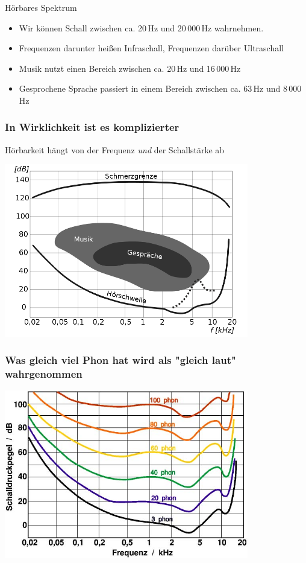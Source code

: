 \documentclass{beamer}
\begin{document}
\begin{frame}{Hörbares Spektrum}

\begin{itemize}
    \item 
    Wir können Schall zwischen ca. 20\,Hz und 20\,000\,Hz wahrnehmen. 
    \item
    Frequenzen darunter heißen Infraschall, Frequenzen darüber Ultraschall
    \item
    Musik nutzt einen Bereich zwischen ca. 20\,Hz und 16\,000\,Hz
    \item
    Gesprochene Sprache passiert in einem Bereich zwischen ca. 63\,Hz und 8\,000\, Hz
\end{itemize}


\end{frame}



\begin{frame}
\frametitle{In Wirklichkeit ist es komplizierter}
\pause

Hörbarkeit hängt von der Frequenz \emph{und} der Schallstärke ab

\begin{center}
\includegraphics[width=0.8\textwidth]{Hoerflaeche.png}
\end{center}

\end{frame}

\begin{frame}
\frametitle{Was gleich viel Phon hat wird als "gleich laut" wahrgenommen}

\begin{center}
\includegraphics[width=0.8\textwidth]{Akustik_db2phon.jpg}
\end{center}

\end{frame}
\end{document}
